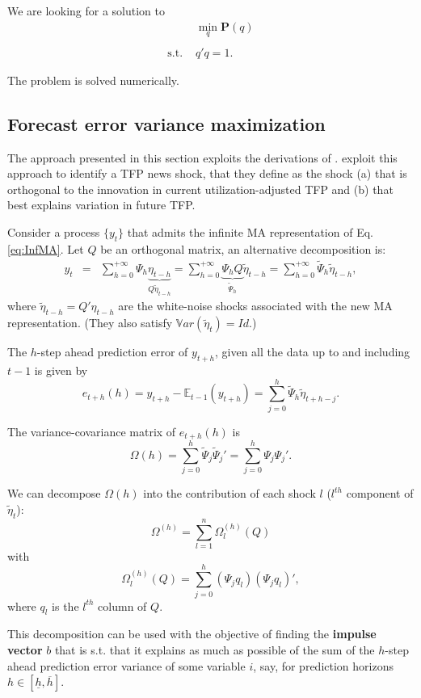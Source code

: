 \documentclass[
  12pt,
]{book}
\theoremstyle{definition}
\theoremstyle{definition}
\theoremstyle{definition}
\theoremstyle{definition}
\theoremstyle{remark}
\begin{document}
We are looking for a solution to
\[\begin{array}{ll}&\min_q \mathbf{P}(q)\\
&\\
\text{s.t. }&q'q=1.\end{array}\]

The problem is solved numerically.

\hypertarget{forecast-error-variance-maximization}{%
\subsection{Forecast error variance maximization}\label{forecast-error-variance-maximization}}

The approach presented in this section exploits the derivations of \citet{Uhlig_2004}. \citet{BARSKY2011273} exploit this approach to identify a TFP news shock, that they define as the shock (a) that is orthogonal to the innovation in current utilization-adjusted TFP and (b) that best explains variation in future TFP.

Consider a process \(\{y_t\}\) that admits the infinite MA representation of Eq. \eqref{eq:InfMA}. Let \(Q\) be an orthogonal matrix, an alternative decomposition is:
\begin{eqnarray}
y_t&=&\sum_{h=0}^{+\infty}\Psi_h\underbrace{\eta_{t-h}}_{Q\tilde \eta_{t-h}} = \sum_{h=0}^{+\infty}\underbrace{\Psi_hQ}_{\tilde\Psi_h}\tilde
\eta_{t-h} = \sum_{h=0}^{+\infty}\tilde\Psi_h\tilde \eta_{t-h},
\end{eqnarray}
where \(\tilde \eta_{t-h}=Q'\eta_{t-h}\) are the white-noise shocks associated with the new MA representation. (They also satisfy \(\mathbb{V}ar(\tilde\eta_t)=Id\).)

The \(h\)-step ahead prediction error of \(y_{t+h}\), given all the data up to and including \(t-1\) is given by
\[
e_{t+h}(h)=y_{t+h}-\mathbb{E}_{t-1}(y_{t+h})=\sum_{j=0}^h\tilde \Psi_h\tilde \eta_{t+h-j}.
\]

The variance-covariance matrix of \(e_{t+h}(h)\) is
\[
\Omega(h)=\sum_{j=0}^h\tilde \Psi_j\tilde \Psi_j'=\sum_{j=0}^h \Psi_j \Psi_j'.
\]

We can decompose \(\Omega(h)\) into the contribution of each shock \(l\) (\(l^{th}\) component of \(\tilde{\eta}_t\)):
\[
\Omega^{(h)}=\sum_{l=1}^n\Omega_l^{(h)}(Q)
\]
with
\[
\Omega_l^{(h)}(Q) =\sum_{j=0}^h(\Psi_jq_l)(\Psi_jq_l)',
\]
where \(q_l\) is the \(l^{th}\) column of \(Q\).

This decomposition can be used with the objective of finding the \textbf{impulse vector} \(b\) that is s.t. that it explains as much as possible of the sum of the \(h\)-step ahead prediction error variance of some variable \(i\), say, for prediction horizons \(h \in [\underline{h} , \overline{h}]\).
\end{document}
